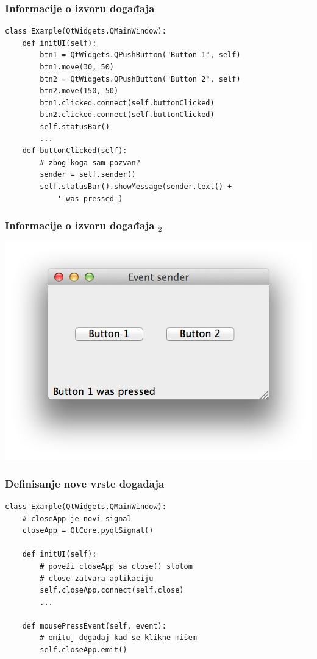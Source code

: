 \documentclass[utf8,compress]{beamer}
\begin{document}
\begin{frame}[fragile]
  \frametitle{Informacije o izvoru događaja}
\begin{verbatim}
class Example(QtWidgets.QMainWindow):
    def initUI(self):      
        btn1 = QtWidgets.QPushButton("Button 1", self)
        btn1.move(30, 50)
        btn2 = QtWidgets.QPushButton("Button 2", self)
        btn2.move(150, 50)
        btn1.clicked.connect(self.buttonClicked)            
        btn2.clicked.connect(self.buttonClicked)
        self.statusBar()
        ...
    def buttonClicked(self):
        # zbog koga sam pozvan?      
        sender = self.sender()
        self.statusBar().showMessage(sender.text() + 
            ' was pressed')
\end{verbatim}
\end{frame}

\begin{frame}[fragile]
  \frametitle{Informacije o izvoru događaja $_2$}
\begin{center}
\includegraphics[scale=0.5]{pyqt11.png}
\end{center}
\end{frame}

\begin{frame}[fragile]
  \frametitle{Definisanje nove vrste događaja}
\begin{verbatim}
class Example(QtWidgets.QMainWindow):
    # closeApp je novi signal
    closeApp = QtCore.pyqtSignal() 

    def initUI(self):
        # poveži closeApp sa close() slotom
        # close zatvara aplikaciju
        self.closeApp.connect(self.close)
        ...
        
    def mousePressEvent(self, event):
        # emituj događaj kad se klikne mišem
        self.closeApp.emit()
\end{verbatim}
\end{frame}
\end{document}
